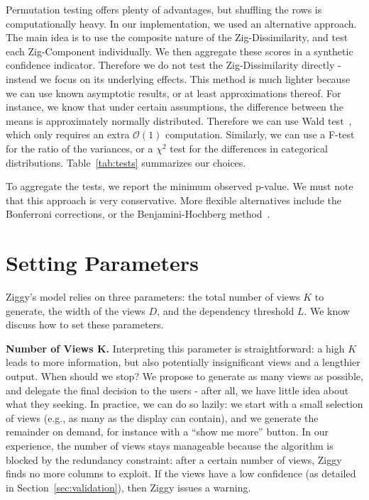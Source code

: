 Permutation testing offers plenty of advantages, but shuffling the rows is
computationally heavy. In our implementation, we used an alternative approach. The
main idea is to use the composite nature of the Zig-Dissimilarity, and test
each Zig-Component individually. We then aggregate these scores in a synthetic
confidence indicator. Therefore we do not test the Zig-Dissimilarity directly -
instead we focus on its underlying effects.  This method is much lighter because we can use
known asymptotic results, or at least approximations thereof. For instance, we
know that under certain assumptions, the difference between the means is
approximately normally distributed. Therefore we can use Wald
test~\cite{wasserman2013all}, which only requires an extra $\mathcal{O}(1)$
computation.  Similarly, we can use a F-test for the ratio of the variances,
or a $\chi^2$ test for the differences in categorical distributions.
Table~\ref{tab:tests} summarizes our choices. 

To aggregate the tests, we report the minimum observed p-value. We must note
that this approach is very conservative. More flexible alternatives include
the Bonferroni corrections, or the Benjamini-Hochberg
method~\cite{wasserman2013all}.

\section{Setting Parameters}
\label{sec:parameters}

Ziggy's model relies on three parameters: the total number of views $K$ to
generate, the width of the views $D$, and the dependency threshold $L$. We know
discuss how to set these parameters.

\textbf{Number of Views K.} Interpreting this parameter is straightforward: a
high $K$ leads to more information, but also potentially insignificant views
and a lengthier output. When should we stop? We propose to generate as many
views as possible, and delegate the final decision to the users - after all, we
have little idea about what they seeking. In practice, we can do so lazily:
we start with a small selection of views (e.g., as many as the display can
contain), and we generate the remainder on demand, for instance with a ``show
me more'' button.  In our experience, the number of views stays
manageable because the algorithm is blocked by the redundancy constraint:
after a certain number of views, Ziggy finds no more columns to exploit. If the
views have a low confidence (as detailed in Section~\ref{sec:validation}), then
Ziggy issues a warning.

